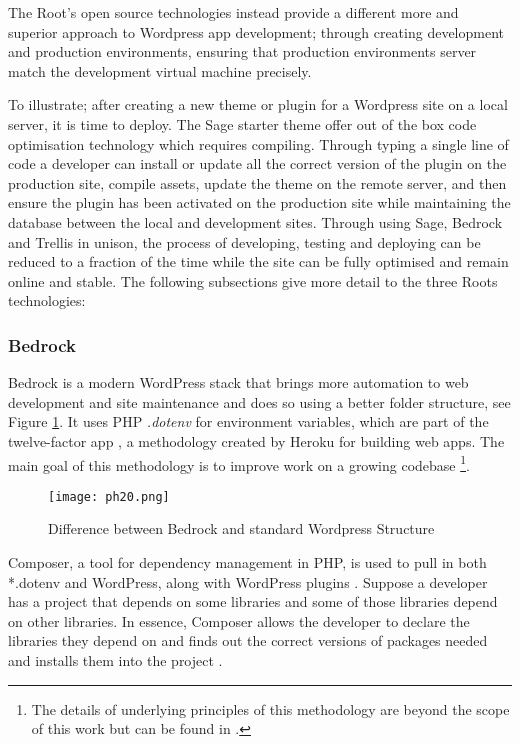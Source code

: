 \documentclass[fontsize=11pt]{extarticle}
\numberwithin{figure}{section} %
\begin{document}
The Root's open source technologies instead provide a different more and
superior approach to Wordpress app development; through creating
development and production environments, ensuring that production
environments server match the development virtual machine precisely.

To illustrate; after creating a new theme or plugin for a Wordpress site
on a local server, it is time to deploy. The Sage starter theme offer
out of the box code optimisation technology which requires compiling.
Through typing a single line of code a developer can install or update
all the correct version of the plugin on the production site, compile
assets, update the theme on the remote server, and then ensure the
plugin has been activated on the production site while maintaining the
database between the local and development sites. Through using Sage,
Bedrock and Trellis in unison, the process of developing, testing and
deploying can be reduced to a fraction of the time while the site can be
fully optimised and remain online and stable. The following subsections
give more detail to the three Roots technologies:

\hypertarget{bedrock}{%
\subsubsection{Bedrock}\label{bedrock}}

Bedrock is a modern WordPress stack that brings more automation to web
development and site maintenance and does so using a better folder
structure, see Figure \ref{bedrockfolder}. It uses PHP \emph{.dotenv}
for environment variables, which are part of the twelve-factor app
\cite{p6}, a methodology created by Heroku for building web
apps\cite{p5}. The main goal of this methodology is to improve work on a
growing codebase
\footnote{The details of underlying principles of this methodology are beyond the scope of this work but can be found in \cite{p8}.}.

\begin{figure}[H]
      \centering
      \texttt{[image: ph20.png]}
      \caption{Difference between Bedrock and standard Wordpress Structure}
\label{bedrockfolder}
 \end{figure}

Composer, a tool for dependency management in PHP, is used to pull in
both *.dotenv and WordPress, along with WordPress plugins \cite{p7}.
Suppose a developer has a project that depends on some libraries and
some of those libraries depend on other libraries. In essence, Composer
allows the developer to declare the libraries they depend on and finds
out the correct versions of packages needed and installs them into the
project \cite{p8}.
\end{document}
